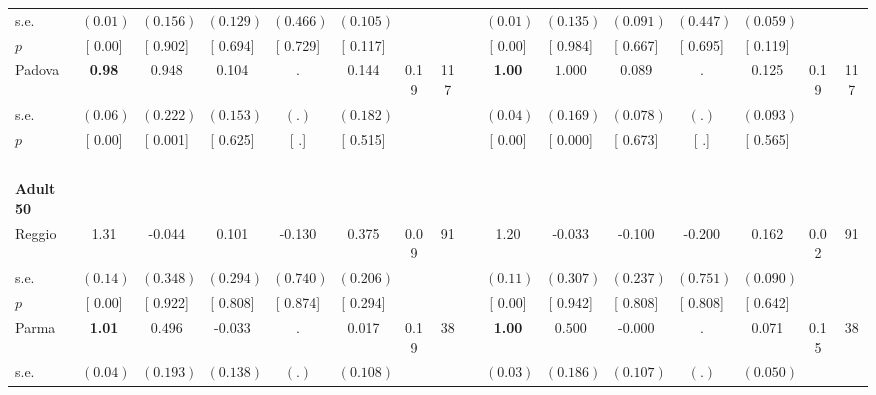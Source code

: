 \begin{longtable}{L{8em} c c c c c c c p{1em} c c c c c c c}
\quad \quad \quad \quad s.e.& $ (     0.01)$ & $ (    0.156)$ & $ (    0.129)$ & $ (    0.466)$ & $ (    0.105)$ & & & & $ (     0.01)$ & $ (    0.135)$ & $ (    0.091)$ & $ (    0.447)$ & $ (    0.059)$ & &  \\*
\quad \quad \quad \quad $ p$ & [     0.00] & [    0.902] & [    0.694] & [    0.729] & [    0.117] & & & & [     0.00] & [    0.984] & [    0.667] & [    0.695] & [    0.119] & &  \\[1em]
\quad \quad \quad Padova& \textbf{     0.98} & $ \mathbf{    0.948}$ &     0.104 &         . &     0.144 &      0.19 &       117 & & \textbf{     1.00} & $ \mathbf{    1.000}$ &     0.089 &         . &     0.125 &      0.19 &       117  \\*
\quad \quad \quad \quad s.e.& $ (     0.06)$ & $ (    0.222)$ & $ (    0.153)$ & $ (        .)$ & $ (    0.182)$ & & & & $ (     0.04)$ & $ (    0.169)$ & $ (    0.078)$ & $ (        .)$ & $ (    0.093)$ & &  \\*
\quad \quad \quad \quad $ p$ & [     0.00] & [    0.001] & [    0.625] & [        .] & [    0.515] & & & & [     0.00] & [    0.000] & [    0.673] & [        .] & [    0.565] & &  \\[1em]
~\\[1em]
\quad \quad \textbf{Adult 50} & & & & & & & & & & & & & & & \\* 
\quad \quad \quad Reggio& 1.31 &    -0.044 &     0.101 &    -0.130 &     0.375 &      0.09 &        91 & & 1.20 &    -0.033 &    -0.100 &    -0.200 &     0.162 &      0.02 &        91  \\*
\quad \quad \quad \quad s.e.& $ (     0.14)$ & $ (    0.348)$ & $ (    0.294)$ & $ (    0.740)$ & $ (    0.206)$ & & & & $ (     0.11)$ & $ (    0.307)$ & $ (    0.237)$ & $ (    0.751)$ & $ (    0.090)$ & &  \\*
\quad \quad \quad \quad $ p$ & [     0.00] & [    0.922] & [    0.808] & [    0.874] & [    0.294] & & & & [     0.00] & [    0.942] & [    0.808] & [    0.808] & [    0.642] & &  \\[1em]
\quad \quad \quad Parma& \textbf{     1.01} & $ \mathbf{    0.496}$ &    -0.033 &         . &     0.017 &      0.19 &        38 & & \textbf{     1.00} & $ \mathbf{    0.500}$ &    -0.000 &         . &     0.071 &      0.15 &        38  \\*
\quad \quad \quad \quad s.e.& $ (     0.04)$ & $ (    0.193)$ & $ (    0.138)$ & $ (        .)$ & $ (    0.108)$ & & & & $ (     0.03)$ & $ (    0.186)$ & $ (    0.107)$ & $ (        .)$ & $ (    0.050)$ & &  \\*

\end{longtable}
